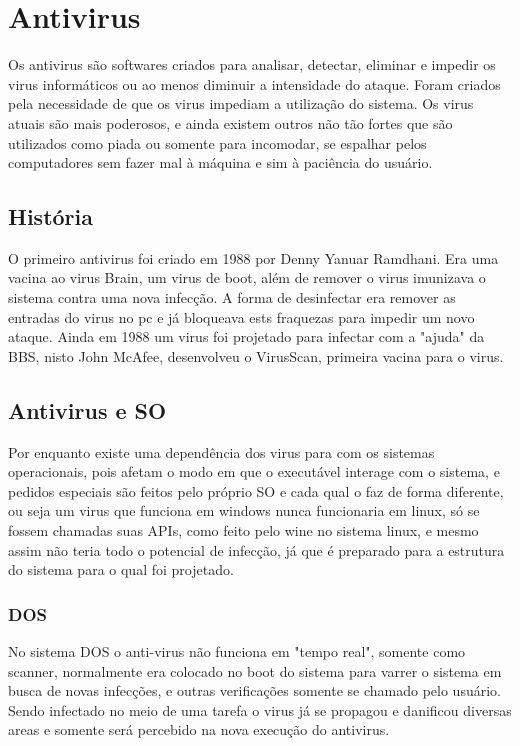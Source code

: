 \chapter{Antivirus}

Os antivirus são softwares criados para analisar, detectar, eliminar e impedir os virus informáticos ou ao menos diminuir a intensidade do ataque. Foram criados pela necessidade de que os virus impediam a utilização do sistema. Os virus atuais são mais poderosos, e ainda existem outros não tão fortes que são utilizados como piada ou somente para incomodar, se espalhar pelos computadores sem fazer mal à máquina e sim à paciência do usuário.

\section{História}
O primeiro antivirus foi criado em 1988 por Denny Yanuar Ramdhani. Era uma vacina ao virus Brain, um virus de boot, além de remover o virus imunizava o sistema contra uma nova infecção. A forma de desinfectar era remover as entradas do virus no pc e já bloqueava ests fraquezas para impedir um novo ataque. Ainda em 1988 um virus foi projetado para infectar com a "ajuda" da BBS, nisto John McAfee, desenvolveu o VirusScan, primeira vacina para o virus.
\section{Antivirus e SO}
Por enquanto existe uma dependência dos virus para com os sistemas operacionais, pois afetam o modo em que o executável interage com o sistema, e pedidos especiais são feitos pelo próprio SO e cada qual o faz de forma diferente, ou seja um virus que funciona em windows nunca funcionaria em linux, só se fossem chamadas suas APIs, como feito pelo wine no sistema linux, e mesmo assim não teria todo o potencial de infecção, já que é preparado para a estrutura do sistema para o qual foi projetado.

\subsection{DOS}
No sistema DOS o anti-virus não funciona em "tempo real", somente como scanner, normalmente era colocado no boot do sistema para varrer o sistema em busca de novas infecções, e outras verificações somente se chamado pelo usuário. Sendo infectado no meio de uma tarefa o virus já se propagou e danificou diversas areas e somente será percebido na nova execução do antivirus.

